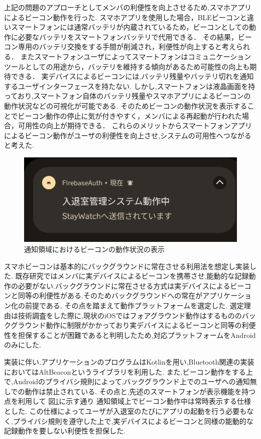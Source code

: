 上記の問題のアプローチとしてメンバの利便性を向上させるため,スマホアプリによるビーコン動作を行った.
スマホアプリを使用した場合，BLEビーコンと違いスマートフォンには通常バッテリが内蔵されているため，ビーコンとしての動作に必要なバッテリをスマートフォンバッテリで代用できる．
その結果，ビーコン専用のバッテリ交換をする手間が削減され，利便性が向上すると考えられる．
またスマートフォンユーザによってスマートフォンはコミュニケーションツールとしての用途から，バッテリを維持する傾向があるため可能性の向上も期待できる．
実デバイスによるビーコンには,バッテリ残量やバッテリ切れを通知するユーザインターフェースを持たない.
しかし,スマートフォンは液晶画面を持っており,スマートフォン自体のバッテリ残量やスマホアプリによるビーコンの動作状況などの可視化が可能である.
そのためビーコンの動作状況を表示することでビーコン動作の停止に気が付きやすく，メンバによる再起動が行われた場合，可用性の向上が期待できる．
これらのメリットからスマートフォンアプリによるビーコン動作がユーザの利便性を向上させ,システムの可用性へつながると考えた.


\begin{figure}[tbh]
  \centering
  \includegraphics[width=12cm]{image/AppNofication.png}
  \caption{通知領域におけるビーコンの動作状況の表示}
  \label{fig:AppNofication}
\end{figure}


スマホビーコンは基本的にバックグラウンドに常在させる利用法を想定し実装した.
既存研究ではメンバに実デバイスによるビーコンを携帯させ,能動的な記録動作の必要がない.バックグラウンドに常在させる方式は実デバイスによるビーコンと同等の利便性がある.そのためバックグラウンドへの常在がアプリケーション化の前提である.
その点を踏まえて動作プラットフォームを選定した.
選定理由は技術調査をした際に,現状のiOSではフォアグラウンド動作はするもののバックグラウンド動作に制限がかかっており実デバイスによるビーコンと同等の利便性を担保することが困難であると判明したため,対応プラットフォームをAndroidのみにした.

実装に伴い,アプリケーションのプログラムはKotlinを用い,Bluetooth関連の実装においてはAltBeaconというライブラリを利用した.
また,ビーコン動作をする上で,Androidのプライバシ規則によって,バックグラウンド上でのユーザへの通知無しでの動作は禁止されている.
その点と,先述のスマートフォンが表示機能を持つ点を利用して 図\ref{fig:AppNofication}に示す通り   通知領域上でビーコン動作中は常時表示する仕様とした.
この仕様によってユーザが入退室のたびにアプリの起動を行う必要もなく,プライバシ規則を遵守した上で,実デバイスによるビーコンと同様の能動的な記録動作を要しない利便性を担保した.




